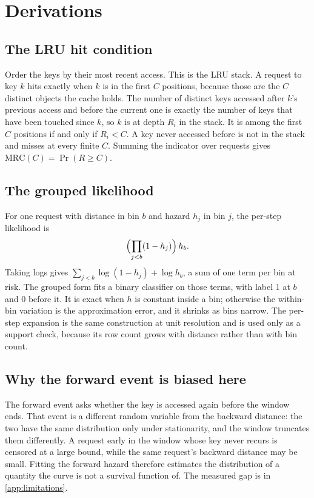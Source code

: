 \appendix
\section{Derivations}
\label{app:proofs}

\subsection{The LRU hit condition}

Order the keys by their most recent access. This is the LRU stack. A request to key
$k$ hits exactly when $k$ is in the first $C$ positions, because those are the $C$
distinct objects the cache holds. The number of distinct keys accessed after $k$'s
previous access and before the current one is exactly the number of keys that have
been touched since $k$, so $k$ is at depth $R_i$ in the stack. It is among the first
$C$ positions if and only if $R_i<C$. A key never accessed before is not in the
stack and misses at every finite $C$. Summing the indicator over requests gives
$\mathrm{MRC}(C)=\Pr(R\ge C)$.

\subsection{The grouped likelihood}
\label{app:grouped}

For one request with distance in bin $b$ and hazard $h_j$ in bin $j$, the per-step
likelihood is
\[
  \Bigl(\prod_{j<b}(1-h_j)\Bigr)\,h_b .
\]
Taking logs gives $\sum_{j<b}\log(1-h_j)+\log h_b$, a sum of one term per bin at
risk. The grouped form fits a binary classifier on those terms, with label 1 at $b$
and 0 before it. It is exact when $h$ is constant inside a bin; otherwise the
within-bin variation is the approximation error, and it shrinks as bins narrow. The
per-step expansion is the same construction at unit resolution and is used only as a
support check, because its row count grows with distance rather than with bin count.

\subsection{Why the forward event is biased here}
\label{app:forward}

The forward event asks whether the key is accessed again before the window ends.
That event is a different random variable from the backward distance: the two have
the same distribution only under stationarity, and the window truncates them
differently. A request early in the window whose key never recurs is censored at a
large bound, while the same request's backward distance may be small. Fitting the
forward hazard therefore estimates the distribution of a quantity the curve is not a
survival function of. The measured gap is in \cref{app:limitations}.

